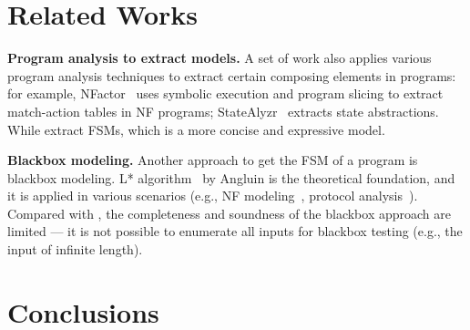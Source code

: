\section{Related Works}
\label{sec:related}
\noindent\textbf{Program analysis to extract models.} A set of work also applies various program analysis techniques 
to extract certain composing elements in programs: for example, NFactor~\cite{wu2016automatic} 
uses symbolic execution and program slicing to extract match-action tables in NF programs; 
StateAlyzr~\cite{khalid2016paving} extracts state abstractions. 
While \Tool{} extract FSMs, which is a more concise and expressive model.

\noindent\textbf{Blackbox modeling.} Another approach to get the FSM of a program is blackbox modeling. 
L* algorithm~\cite{angluin1987learning} by Angluin is the theoretical foundation, 
and it is applied in various scenarios (e.g., NF modeling~\cite{moon2019alembic}, 
protocol analysis~\cite{cho2011mace}). Compared with \Tool{}, 
the completeness and soundness of the blackbox approach are limited --- 
it is not possible to enumerate all inputs for blackbox testing (e.g., the input of infinite length).

\section{Conclusions}